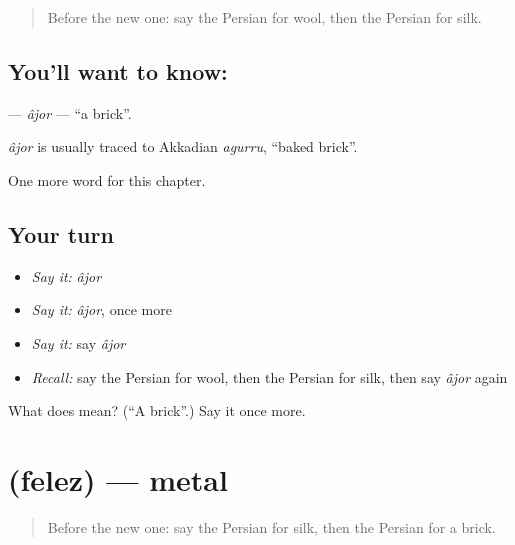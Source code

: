 \label{lesson:FA-C211-ajor}



\begin{quote}
Before the new one: say the Persian for wool, then the Persian for silk.
\end{quote}

\subsection*{You'll want to know: }
\textbf{} — \emph{âjor} — \textquotedblleft{}a brick\textquotedblright{}.

\begin{cousinweb}
\emph{âjor} is usually traced to Akkadian \emph{agurru}, \textquotedblleft{}baked brick\textquotedblright{}.
\end{cousinweb}

\begin{grammarlens}[title={What you've built}]
One more word for this chapter.
\end{grammarlens}

\subsection*{Your turn}
\begin{itemize}
\raggedright
  \item \emph{Say it:} \emph{âjor}
  \item \emph{Say it:} \emph{âjor}, once more
  \item \emph{Say it:} say \emph{âjor}
  \item \emph{Recall:} say the Persian for wool, then the Persian for silk, then say \emph{âjor} again
\end{itemize}

\begin{tcolorbox}[breakable,colback=teal!4,colframe=teal!35!black,title={Before you move on}]
What does  mean? (\textquotedblleft{}A brick\textquotedblright{}.) Say it once more.
\end{tcolorbox}
\section[\texorpdfstring{\fa{فلز} (felez)}{فلز (felez)}]{ (felez) — metal}

\label{lesson:FA-C211-felez}



\begin{quote}
Before the new one: say the Persian for silk, then the Persian for a brick.
\end{quote}

